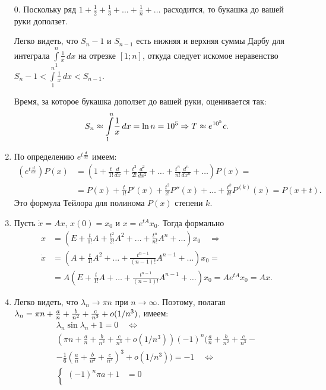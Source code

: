\documentclass[a4paper]{article}
\newcommand*{\p}[1]{#1\nobreak\discretionary{}{\hbox{$\mathsurround=0pt #1$}}{}}
\begin{document}
\begin{enumerate}
  \item[0.] Поскольку ряд
  $1+\frac{1}{2}+\frac{1}{3}+\ldots+\frac{1}{n}+\ldots$ расходится,
  то букашка до вашей руки доползет.

  Легко видеть, что $S_{n}-1$ и $S_{n-1}$ есть нижняя и верхняя
  суммы Дарбу для интеграла
  $\int\limits_1^n\!\frac{1}{x}\,dx$ на отрезке $[1;n]$,
  откуда следует искомое неравенство $S_n-1<\int\limits_1^n\!\frac{1}{x}\,dx
  <S_{n-1}$.

  Время, за которое букашка доползет до вашей руки, оценивается так:
  $$S_{n}\approx \int\limits_1^{n}\!\frac{1}{x}\,dx=\ln n=10^5\Rightarrow
  T\approx e^{10^5} \mathrm{\textsl{c}}.$$
  \item По определению $e^{t\frac{d}{dx}}$ имеем:
  \begin{align*}
  (e^{t\frac{d}{dx}})P(x)&=(1+\frac{t}{1!}\frac{d}{dx}+\frac{t^2}{2!}\frac{d^2}{dx^2}+\ldots+
  \frac{t^n}{n!}\frac{d^n}{dx^n}+\ldots)P(x)=\\
  &=P(x)+\frac{t}{1!}P'(x)+\frac{t^2}{2!}P''(x)+\ldots+\frac{t^k}{k!}P^{(k)}(x)=P(x+t).
  \end{align*}
  Это формула Тейлора для полинома $P(x)$ степени $k$.
  \item Пусть $\dot{x}=Ax$, $x(0)=x_0$ и $x=e^{tA}x_0$. Тогда
  формально
  \begin{align*}
  x&=(E+\frac{t}{1!}A+\frac{t^2}{2!}A^2+\ldots+\frac{t^n}{n!}A^n+\ldots)x_0\quad\Rightarrow\\
  \dot{x}&=(A+\frac{t}{1!}A^2+\ldots+\frac{t^{n-1}}{(n-1)!}A^{n-1}+\ldots)x_0=\\
  &=A(E+\frac{t}{1!}A+\ldots+\frac{t^{n-1}}{(n-1)!}A^{n-1}+\ldots)x_0=Ae^{tA}x_0=Ax.
  \end{align*}
  \item Легко видеть, что $\lambda_n\rightarrow \pi n$ при
  $n\rightarrow\infty$. Поэтому, полагая $\lambda_n\p=\pi n+\frac{a}{n}+\frac{b}{n^2}+
  \frac{c}{n^3}+o(1/n^3)$, имеем:
  \begin{gather*}
  \lambda_n \sin\lambda_n+1=0\quad\Leftrightarrow\\
  \left(\pi n+\frac{a}{n}+\frac{b}{n^2}+\frac{c}{n^3}+o(1/n^3)\right)
  (-1)^n\Bigg(\frac{a}{n}+\frac{b}{n^2}+\frac{c}{n^3}-\\
  -\frac{1}{6}\left(\frac{a}{n}+\frac{b}{n^2}+\frac{c}{n^3}\right)^3+o(1/n^3)\Bigg)=-1\quad\Leftrightarrow\\
  \left\{
  \begin{aligned}
  (-1)^n \pi a +1&= 0\\

\end{aligned}
\end{gather*}
\end{enumerate}
\end{document}
